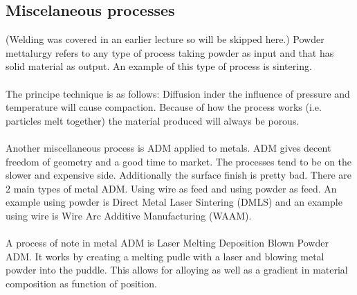 \documentclass[11pt, a4paper]{article}
\begin{document}
\subsection{Miscelaneous processes}
(Welding was covered in an earlier lecture so will be skipped here.) Powder mettalurgy refers to any type of process taking powder as input and that has solid material as output. An example of this type of process is sintering.\\
\\
The principe technique is as follows: Diffusion inder the influence of pressure and temperature will cause compaction. Because of how the process works (i.e. particles melt together) the material produced will always be porous.\\
\\
Another miscellaneous process is ADM applied to metals. ADM gives decent freedom of geometry and a good time to market. The processes tend to be on the slower and expensive side. Additionally the surface finish is pretty bad. There are $2$ main types of metal ADM. Using wire as feed and using powder as feed. An example using powder is Direct Metal Laser Sintering (DMLS) and an example using wire is Wire Arc Additive Manufacturing (WAAM).\\
\\
A process of note in metal ADM is Laser Melting Deposition Blown Powder ADM. It works by creating a melting pudle with a laser and blowing metal powder into the puddle. This allows for alloying as well as a gradient in material composition as function of position. 
\end{document}
